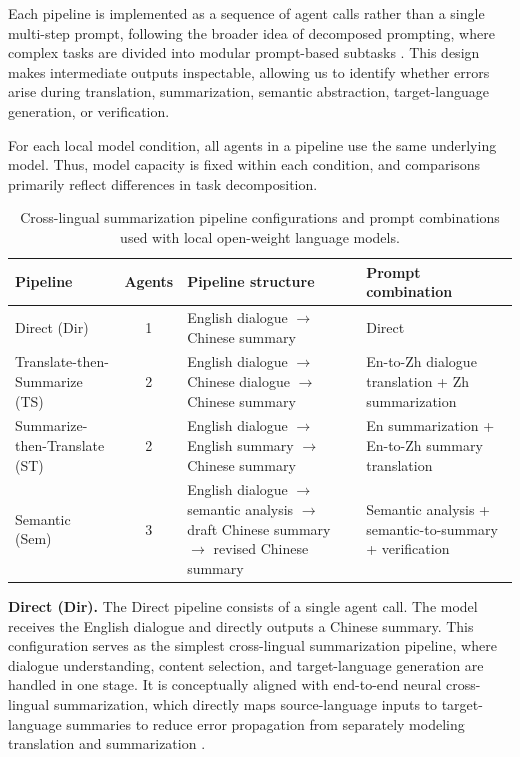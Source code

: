 \documentclass[11pt]{article}
\begin{document}
Each pipeline is implemented as a sequence of agent calls rather than a single
multi-step prompt, following the broader idea of decomposed prompting, where
complex tasks are divided into modular prompt-based subtasks
\citep{khot-etal-2023-decomposed}. This design makes intermediate outputs inspectable, allowing
us to identify whether errors arise during translation, summarization, semantic
abstraction, target-language generation, or verification.

For each local model condition, all agents in a pipeline use the same underlying
model. Thus, model capacity is fixed within each condition, and comparisons
primarily reflect differences in task decomposition.

\begin{table}[t]
\centering
\small
\setlength{\tabcolsep}{5pt}
\renewcommand{\arraystretch}{1.18}
\begin{tabular}{
>{\raggedright\arraybackslash}p{}
c
>{\raggedright\arraybackslash}p{}
>{\raggedright\arraybackslash}p{}
}
\hline
\textbf{Pipeline} & \textbf{Agents} & \textbf{Pipeline structure} & \textbf{Prompt combination} \\
\hline
Direct (Dir) & 1 &
English dialogue $\rightarrow$ Chinese summary &
Direct \\

Translate-then-Summarize (TS) & 2 &
English dialogue $\rightarrow$ Chinese dialogue $\rightarrow$ Chinese summary &
En-to-Zh dialogue translation + Zh summarization \\

Summarize-then-Translate (ST) & 2 &
English dialogue $\rightarrow$ English summary $\rightarrow$ Chinese summary &
En summarization + En-to-Zh summary translation \\

Semantic (Sem) & 3 &
English dialogue $\rightarrow$ semantic analysis $\rightarrow$ draft Chinese summary $\rightarrow$ revised Chinese summary &
Semantic analysis + semantic-to-summary + verification \\
\hline
\end{tabular}
\caption{Cross-lingual summarization pipeline configurations and prompt combinations used with local open-weight language models.}
\label{tab:cls_pipeline_configs}
\end{table}

\medskip
\noindent\textbf{Direct (Dir).}
The Direct pipeline consists of a single agent call. The model receives the
English dialogue and directly outputs a Chinese summary. This configuration
serves as the simplest cross-lingual summarization pipeline, where dialogue
understanding, content selection, and target-language generation are handled in
one stage. It is conceptually aligned with end-to-end neural cross-lingual
summarization, which directly maps source-language inputs to target-language
summaries to reduce error propagation from separately modeling translation and
summarization \citep{zhu-etal-2019-ncls,zhu-etal-2020-attend}.
\end{document}
